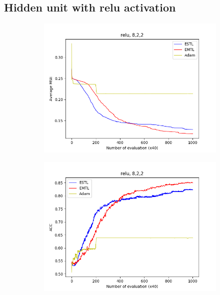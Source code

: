 \documentclass[conference]{IEEEtran}
\theoremstyle{definition}
\begin{document}
  \subsection{Hidden unit with relu activation}
    \begin{figure}
      \centering
      \begin{subfigure}{0.48\linewidth}
        \centering
        \includegraphics[width=1.0\linewidth]{images/relu/avg_mse8,2,2.png}
      \end{subfigure}
      \begin{subfigure}{0.48\linewidth}
        \centering
        \includegraphics[width=1.0\linewidth]{images/relu/avg_acc8,2,2.png}
      \end{subfigure}


\end{figure}
\end{document}
